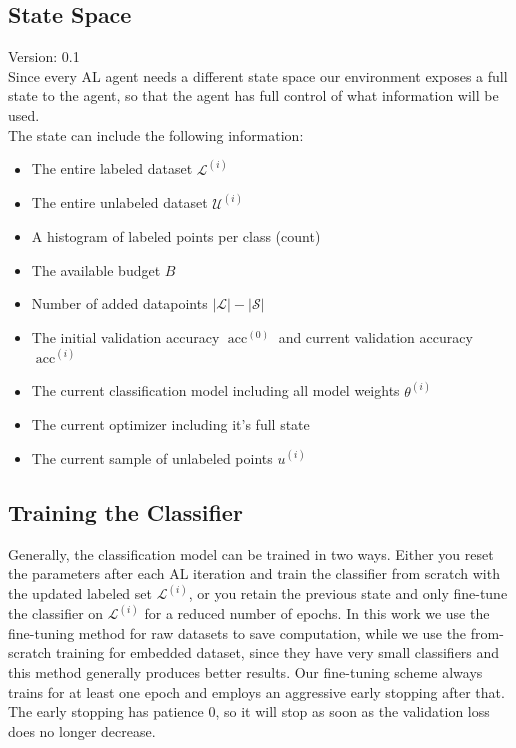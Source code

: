 \documentclass[]{article}
\begin{document}
\subsection{State Space}
{\color{red} Version: 0.1}\\
Since every AL agent needs a different state space our environment exposes a full state to the agent, so that the agent has full control of what information will be used. \\ [1mm]
The state can include the following information:
\begin{itemize}
	\item The entire labeled dataset $\mathcal{L}^{(i)}$
	\item The entire unlabeled dataset $\mathcal{U}^{(i)}$
	\item A histogram of labeled points per class (count)
	\item The available budget $B$
	\item Number of added datapoints $|\mathcal{L}| - |\mathcal{S}|$
	\item The initial validation accuracy $\operatorname{acc}^{(0)}$ and current validation accuracy $\operatorname{acc}^{(i)}$
	\item The current classification model including all model weights $\theta^{(i)}$
	\item The current optimizer including it's full state
	\item The current sample of unlabeled points $u^{(i)}$
\end{itemize}

\subsection{Training the Classifier}\label{sec:training_the_classifier}
Generally, the classification model can be trained in two ways. Either you reset the parameters after each AL iteration and train the classifier from scratch with the updated labeled set $\mathcal{L}^{(i)}$, or you retain the previous state and only fine-tune the classifier on $\mathcal{L}^{(i)}$ for a reduced number of epochs.
In this work we use the fine-tuning method for raw datasets to save computation, while we use the from-scratch training for embedded dataset, since they have very small classifiers and this method generally produces better results.
Our fine-tuning scheme always trains for at least one epoch and employs an aggressive early stopping after that.
The early stopping has patience 0, so it will stop as soon as the validation loss does no longer decrease.
\end{document}
